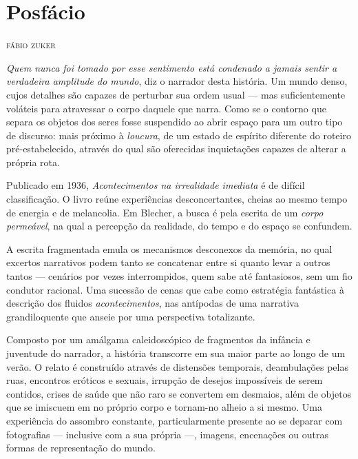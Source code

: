 \newcommand{\subtitulo}[1]{\NoCaseChange{\textnormal{\break\Large\itshape#1}}}
\chapter*{Posfácio\smallskip\subtitulo{O instável mundo de Max Blecher}}

\begin{flushright}
\textsc{fábio zuker}
\end{flushright}

\noindent\textit{Quem nunca foi tomado por esse sentimento está condenado a jamais sentir a verdadeira amplitude do mundo}, diz o narrador desta história. Um mundo  denso, cujos detalhes são capazes de perturbar sua ordem usual --- mas suficientemente voláteis para atravessar o corpo daquele que narra. Como se o contorno que separa os objetos dos seres fosse suspendido ao abrir espaço para um outro tipo de discurso: mais próximo à \textit{loucura}, de um estado de espírito diferente do roteiro pré-estabelecido, através do qual são oferecidas inquietações capazes de alterar a própria rota.

Publicado em 1936, \textit{Acontecimentos na irrealidade imediata} é de difícil classificação. O livro reúne experiências desconcertantes, cheias ao mesmo tempo de energia e de melancolia. Em Blecher, a busca é pela escrita de um \textit{corpo permeável}, na qual a percepção da realidade, do tempo e do espaço se confundem. 

A escrita fragmentada emula os mecanismos desconexos da memória, no qual excertos narrativos podem tanto se concatenar entre si quanto levar a outros tantos --- cenários por vezes interrompidos, quem sabe até fantasiosos, sem um fio condutor racional. Uma sucessão de cenas que cabe como estratégia fantástica à descrição dos fluidos \textit{acontecimentos}, nas antípodas de uma narrativa grandiloquente que anseie por uma perspectiva totalizante.

Composto por um amálgama caleidoscópico de fragmentos da infância e juventude do narrador, a história transcorre em sua maior parte ao longo de um verão. O relato é construído através de distensões temporais, deambulações pelas ruas, encontros eróticos e sexuais, irrupção de desejos impossíveis de serem contidos, crises de saúde que não raro se convertem em desmaios, além de objetos que se imiscuem em no próprio corpo e tornam-no alheio a si mesmo. Uma experiência do assombro constante, particularmente presente ao se deparar com fotografias --- inclusive com a sua própria ---, imagens, encenações ou outras formas de representação do mundo.


